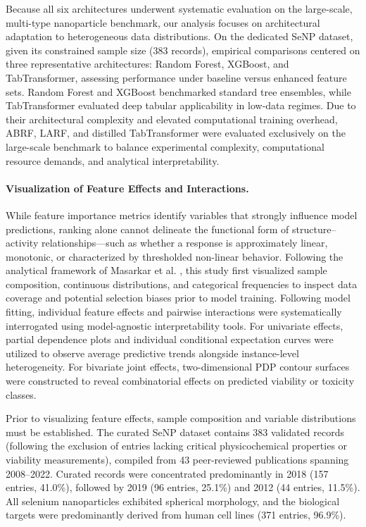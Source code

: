 \documentclass[letterpaper]{article}
\begin{document}
Because all six architectures underwent systematic evaluation on the large-scale, multi-type nanoparticle benchmark, our analysis focuses on architectural adaptation to heterogeneous data distributions. On the dedicated SeNP dataset, given its constrained sample size (383 records), empirical comparisons centered on three representative architectures: Random Forest, XGBoost, and TabTransformer, assessing performance under baseline versus enhanced feature sets. Random Forest and XGBoost benchmarked standard tree ensembles, while TabTransformer evaluated deep tabular applicability in low-data regimes. Due to their architectural complexity and elevated computational training overhead, ABRF, LARF, and distilled TabTransformer were evaluated exclusively on the large-scale benchmark to balance experimental complexity, computational resource demands, and analytical interpretability.

\paragraph{Visualization of Feature Effects and Interactions.}
While feature importance metrics identify variables that strongly influence model predictions, ranking alone cannot delineate the functional form of structure--activity relationships—such as whether a response is approximately linear, monotonic, or characterized by thresholded non-linear behavior. Following the analytical framework of Masarkar et al. \cite{masarkar2024}, this study first visualized sample composition, continuous distributions, and categorical frequencies to inspect data coverage and potential selection biases prior to model training. Following model fitting, individual feature effects and pairwise interactions were systematically interrogated using model-agnostic interpretability tools. For univariate effects, partial dependence plots and individual conditional expectation curves were utilized to observe average predictive trends alongside instance-level heterogeneity. For bivariate joint effects, two-dimensional PDP contour surfaces were constructed to reveal combinatorial effects on predicted viability or toxicity classes.

Prior to visualizing feature effects, sample composition and variable distributions must be established. The curated SeNP dataset contains 383 validated records (following the exclusion of entries lacking critical physicochemical properties or viability measurements), compiled from 43 peer-reviewed publications spanning 2008--2022. Curated records were concentrated predominantly in 2018 (157 entries, 41.0\%), followed by 2019 (96 entries, 25.1\%) and 2012 (44 entries, 11.5\%). All selenium nanoparticles exhibited spherical morphology, and the biological targets were predominantly derived from human cell lines (371 entries, 96.9\%).
\end{document}
